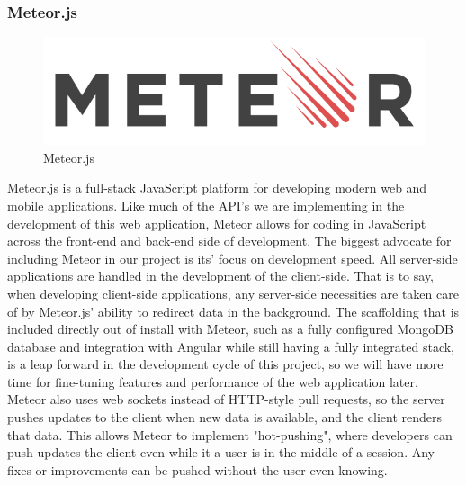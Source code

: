 \documentclass[12pt,a4paper]{report}
\begin{document}
			\subsubsection{Meteor.js}
			\begin{figure}
				\includegraphics[scale=.2]{meteorJS}
				\caption{Meteor.js}
				\label{fig: Meteor.js}
			\end{figure}
			Meteor.js is a full-stack JavaScript platform for developing modern web and mobile applications. Like much of the API's we are implementing in the development of this web application, Meteor allows for coding in JavaScript across the front-end and back-end side of development. The biggest advocate for including Meteor in our project is its' focus on development speed. All server-side applications are handled in the development of the client-side. That is to say, when developing client-side applications, any server-side necessities are taken care of by Meteor.js’ ability to redirect data in the background. The scaffolding that is included directly out of install with Meteor, such as a fully configured MongoDB database and integration with Angular while still having a fully integrated stack, is a leap forward in the development cycle of this project, so we will have more time for fine-tuning features and performance of the web application later. Meteor also uses web sockets instead of HTTP-style pull requests, so the server pushes updates to the client when new data is available, and the client renders that data. This allows Meteor to implement "hot-pushing", where developers can push updates the client even while it a user is in the middle of a session. Any fixes or improvements can be pushed without the user even knowing.
	
\end{document}
